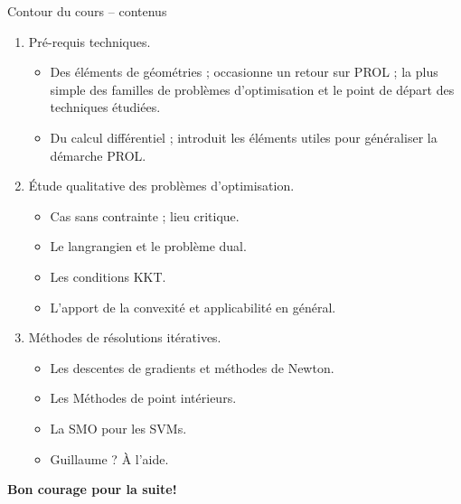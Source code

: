 \documentclass[aspectratio = 169]{beamer}
\begin{document}
\begin{frame}{Contour du cours -- contenus}
\begin{enumerate}
  \item<1->
    Pré-requis techniques.
    \begin{itemize}
    \item Des éléments de géométries ; occasionne un retour sur PROL ;
      la plus simple des familles de problèmes d'optimisation et le
      point de départ des techniques étudiées.
    \item Du calcul différentiel ; introduit les éléments utiles pour
      généraliser la démarche PROL.
    \end{itemize}
  \item<2->
    Étude qualitative des problèmes d'optimisation.
    \begin{itemize}
    \item Cas sans contrainte ; lieu critique.
    \item Le langrangien et le problème dual.
    \item Les conditions KKT.
    \item L'apport de la convexité et applicabilité en général.
    \end{itemize}
  \item<3->
    Méthodes de résolutions itératives.
    \begin{itemize}
    \item Les descentes de gradients et méthodes de Newton.
    \item Les Méthodes de point intérieurs.
    \item La SMO pour les SVMs.
    \item<4-> Guillaume ? À l'aide.
    \end{itemize}
  \end{enumerate}
\end{frame}

\begin{frame}
  \begin{center}
    {\huge \textbf{Bon courage pour la suite!}}
   \end{center}
 \end{frame}

\end{document}
